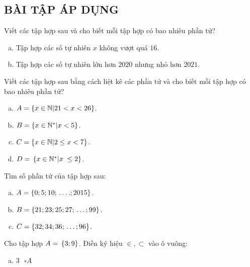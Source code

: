 \subsection{BÀI TẬP ÁP DỤNG}
\begin{bt}
Viết các tập hợp sau và cho biết mỗi tập hợp có bao nhiêu phần tử?
\begin{enumerate}[a)]
\item Tập hợp các số tự nhiên $x$ không vượt quá $16$.
\item Tập hợp các số tự nhiên lớn hơn $2020$ nhưng nhỏ hơn $2021$.
\end{enumerate}
\end{bt}   \begin{bt}
Viết các tập hợp sau bằng cách liệt kê các phần tử và cho biết mỗi tập hợp có bao nhiêu phần tử?
\begin{enumerate}[a)]
\item ${A{\rm{ }} = {\rm{ }}\{ x \in \mathbb{N}|21{\rm{ }} < {\rm{ }}x{\rm{ }} < {\rm{ }}26\} }$.
\item ${B{\rm{ }} = {\rm{ }}\{ x \in {\mathbb{N}^*}|x{\rm{ }} < {\rm{ }}5\} }$.
\item ${C{\rm{ }} = {\rm{ }}\{ x \in \mathbb{N}|2{\rm{ }} \le {\rm{ }}x{\rm{ }} < {\rm{ }}7\} }$.
\item ${D{\rm{ }} = {\rm{ }}\left\{ {x \in {\mathbb{N}^*}|x\; \le {\rm{ }}2{\rm{ }}} \right\}}$.
\end{enumerate}
\end{bt}   \begin{bt}
Tìm số phần tử của tập hợp sau:
\begin{enumerate}[a)]
\item $A{\rm{ }} = \left\{ {0;{\rm{ }}5;{\rm{ }}10;{\rm{ }} \ldots .;{\rm{ }}2015} \right\}$.
\item $B{\rm{ }} = \left\{ {21;{\rm{ }}23;{\rm{ }}25;{\rm{ }}27;{\rm{ }} \ldots ;{\rm{ }}99} \right\}$.
\item $C{\rm{ }} = \left\{ {32;{\rm{ }}34;{\rm{ }}36;{\rm{ }} \ldots ;{\rm{ }}96} \right\}$.
\end{enumerate}
\end{bt}   \begin{bt}
Cho tập hợp $A{\rm{ }} = {\rm{ }}\left\{ {3;{\rm{ }}9} \right\}$. Điền ký hiệu $\in, \subset$ vào ô vuông:
\begin{multicols}{2}
\begin{enumerate}[a)]
\item $3 \text{ }\square A$

\end{enumerate}
\end{multicols}
\end{bt}
